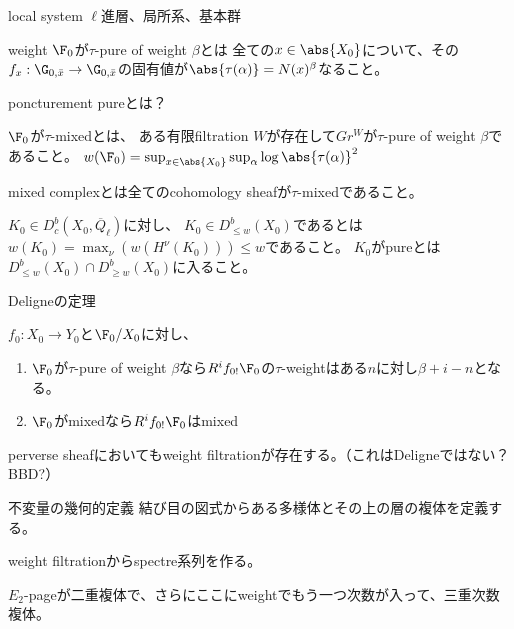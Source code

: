 \documentclass[dvipdfmx]{beamer}
\begin{document}
\begin{frame}{local system}
  $\ell$進層、局所系、基本群
\end{frame}

\begin{frame}{weight}    
    $\F_0$が$\tau$-pure of weight $\beta$とは
    全ての$x\in\abs{X_0}$について、その$f_x:\G_{0,\bar{x}}\to \G_{0,\bar{x}}$の固有値が$\abs{\tau(\alpha)}=N(x)^\beta$なること。

    poncturement pureとは？

    $\F_0$が$\tau$-mixedとは、
    ある有限filtration $W$が存在して$Gr^W$が$\tau$-pure of weight $\beta$であること。
    $w(\F_0)=\sup_{x\in\abs{X_0}}\sup_\alpha\log\abs{\tau(\alpha)}^2$

    mixed complexとは全てのcohomology sheafが$\tau$-mixedであること。

    $K_0\in D^b_c(X_0,\overline{Q}_\ell)$に対し、
    $K_0\in D^b_{\leq w}(X_0)$であるとは$w(K_0)=\max_\nu(w(H^\nu(K_0)))\leq w$であること。
    $K_0$がpureとは$D^b_{\leq w}(X_0)\cap D^b_{\geq w}(X_0)$に入ること。
\end{frame}

\begin{frame}{Deligneの定理}
  \begin{thm}[Deligne]
    $f_0:X_0\to Y_0$と$\F_0/X_0$に対し、
    \begin{enumerate}
    \item $\F_0$が$\tau$-pure of weight $\beta$なら$R^if_{0!}\F_0$の$\tau$-weightはある$n$に対し$\beta+i-n$となる。
    \item $\F_0$がmixedなら$R^if_{0!}\F_0$はmixed
    \end{enumerate}
  \end{thm}

  perverse sheafにおいてもweight filtrationが存在する。（これはDeligneではない？BBD?）
\end{frame}


\begin{frame}{不変量の幾何的定義}
  結び目の図式からある多様体とその上の層の複体を定義する。

  weight filtrationからspectre系列を作る。

  $E_2$-pageが二重複体で、さらにここにweightでもう一つ次数が入って、三重次数複体。
\end{frame}
\end{document}
